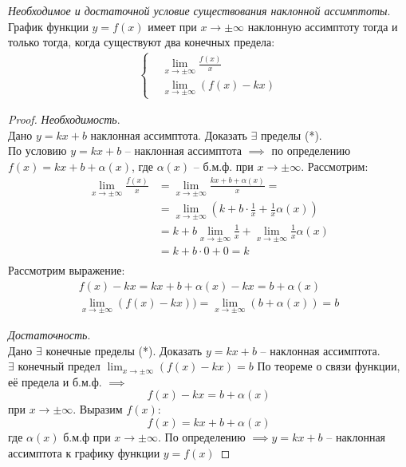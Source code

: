 \begin{theorem}
  \textit{Необходимое и достаточной условие существования наклонной ассимптоты}. \\ 
   График функции $y = f(x)$ имеет при  $x \to \pm\infty$ наклонную ассимптоту тогда и только тогда, когда существуют два конечных предела:
   \begin{align*}
     \begin{cases}
        &\lim_{x \to \pm\infty} \frac{f(x)}{x} \\
        &\lim_{x \to \pm\infty} (f(x) - kx)
     \end{cases} \tag{*} 
   \end{align*}
\end{theorem}
\begin{proof}
  \textit{Необходимость}. \\
  Дано $y = kx + b$ наклонная ассимптота. Доказать  $\exists $ пределы (*).\\
  По условию $y = kx + b$ -- наклонная ассимптота  $\implies $ по определению $f(x) = kx + b + \alpha(x)$, где $\alpha(x)$ -- б.м.ф. при $x \to  \pm \infty$.
  Рассмотрим:
  \begin{align*}
    \lim_{x \to \pm\infty} \frac{f(x)}{x} &= \lim_{x \to \pm\infty} \frac{kx + b + \alpha(x)}{x} = \\
    &= \lim_{x \to \pm\infty} (k + b \cdot \frac{1}{x} + \frac{1}{x} \alpha(x)) \\
    &= k + b \lim_{x \to \pm\infty} \frac{1}{x} + \lim_{x \to \pm\infty}\frac{1}{x} \alpha(x) \\
    &= k + b\cdot 0 + 0 = k \\
  \end{align*}
  Рассмотрим выражение:
  \begin{align*}
    f(x) - kx = kx + b + \alpha(x) - kx = b + \alpha(x) \\
    \lim_{x \to \pm\infty} (f(x) - kx)) = \lim_{x \to \pm\infty} (b + \alpha(x)) = b 
  \end{align*}

  \textit{Достаточность}. \\ 
  Дано $\exists $ конечные пределы (*). Доказать $y = kx + b$ -- наклонная ассимптота. \\

   $\exists $ конечный предел $\lim_{x \to \pm\infty} (f(x) - kx) = b$
   По теореме о связи функции, её предела и б.м.ф. $\implies$ \[
   f(x) - kx = b + \alpha(x)
   \]  при $x \to \pm\infty$. Выразим $f(x)$:  \[
   f(x) = kx + b + \alpha(x)
   \] где $\alpha(x)$ б.м.ф при $x \to \pm\infty$.
   По определению $\implies y = kx + b$ -- наклонная ассимптота к графику функции $y = f(x)$
\end{proof}

